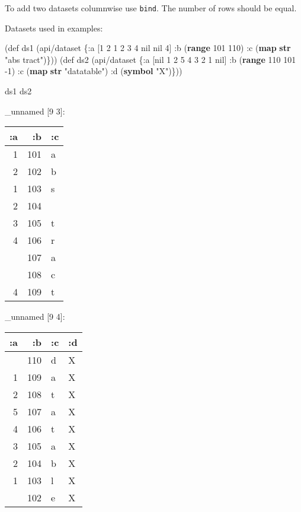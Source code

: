 \documentclass[]{article}
\newenvironment{Shaded}{\begin{snugshade}}{\end{snugshade}}
\newcommand{\KeywordTok}[1]{\textcolor[rgb]{0.13,0.29,0.53}{\textbf{#1}}}
\newcommand{\DecValTok}[1]{\textcolor[rgb]{0.00,0.00,0.81}{#1}}
\newcommand{\StringTok}[1]{\textcolor[rgb]{0.31,0.60,0.02}{#1}}
\newcommand{\FunctionTok}[1]{\textcolor[rgb]{0.00,0.00,0.00}{#1}}
\newcommand{\VariableTok}[1]{\textcolor[rgb]{0.00,0.00,0.00}{#1}}
\newcommand{\BuiltInTok}[1]{#1}
\newcommand{\AttributeTok}[1]{\textcolor[rgb]{0.77,0.63,0.00}{#1}}
\newcommand{\NormalTok}[1]{#1}
\begin{document}
To add two datasets columnwise use \texttt{bind}. The number of rows
should be equal.

Datasets used in examples:

\begin{Shaded}
\begin{Highlighting}[]
\NormalTok{(}\BuiltInTok{def}\FunctionTok{ ds1 }\NormalTok{(api/dataset \{}\AttributeTok{:a}\NormalTok{ [}\DecValTok{1} \DecValTok{2} \DecValTok{1} \DecValTok{2} \DecValTok{3} \DecValTok{4} \VariableTok{nil} \VariableTok{nil} \DecValTok{4}\NormalTok{]}
                       \AttributeTok{:b}\NormalTok{ (}\KeywordTok{range} \DecValTok{101} \DecValTok{110}\NormalTok{)}
                       \AttributeTok{:c}\NormalTok{ (}\KeywordTok{map} \KeywordTok{str} \StringTok{"abs tract"}\NormalTok{)\}))}
\NormalTok{(}\BuiltInTok{def}\FunctionTok{ ds2 }\NormalTok{(api/dataset \{}\AttributeTok{:a}\NormalTok{ [}\VariableTok{nil} \DecValTok{1} \DecValTok{2} \DecValTok{5} \DecValTok{4} \DecValTok{3} \DecValTok{2} \DecValTok{1} \VariableTok{nil}\NormalTok{]}
                       \AttributeTok{:b}\NormalTok{ (}\KeywordTok{range} \DecValTok{110} \DecValTok{101} \DecValTok{-1}\NormalTok{)}
                       \AttributeTok{:c}\NormalTok{ (}\KeywordTok{map} \KeywordTok{str} \StringTok{"datatable"}\NormalTok{)}
                       \AttributeTok{:d}\NormalTok{ (}\KeywordTok{symbol} \StringTok{"X"}\NormalTok{)\}))}
\end{Highlighting}
\end{Shaded}

\begin{Shaded}
\begin{Highlighting}[]
\NormalTok{ds1}
\NormalTok{ds2}
\end{Highlighting}
\end{Shaded}

\_unnamed {[}9 3{]}:

\begin{longtable}[]{@{}rrl@{}}
\toprule
:a & :b & :c\tabularnewline
\midrule
\endhead
1 & 101 & a\tabularnewline
2 & 102 & b\tabularnewline
1 & 103 & s\tabularnewline
2 & 104 &\tabularnewline
3 & 105 & t\tabularnewline
4 & 106 & r\tabularnewline
& 107 & a\tabularnewline
& 108 & c\tabularnewline
4 & 109 & t\tabularnewline
\bottomrule
\end{longtable}

\_unnamed {[}9 4{]}:

\begin{longtable}[]{@{}rrll@{}}
\toprule
:a & :b & :c & :d\tabularnewline
\midrule
\endhead
& 110 & d & X\tabularnewline
1 & 109 & a & X\tabularnewline
2 & 108 & t & X\tabularnewline
5 & 107 & a & X\tabularnewline
4 & 106 & t & X\tabularnewline
3 & 105 & a & X\tabularnewline
2 & 104 & b & X\tabularnewline
1 & 103 & l & X\tabularnewline
& 102 & e & X\tabularnewline
\bottomrule
\end{longtable}
\end{document}
